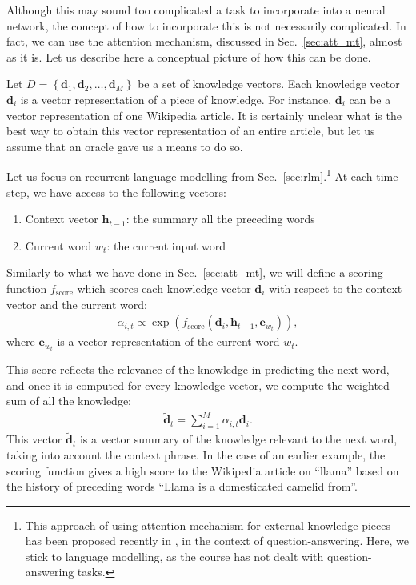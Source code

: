 \documentclass{report}
\newcommand{\vect}[1]{\mathbf{#1}}
\newcommand{\ve}[0]{\vect{e}}
\newcommand{\vh}[0]{\vect{h}}
\newcommand{\vd}[0]{\vect{d}}
\begin{document}
Although this may sound too complicated a task to incorporate into a neural
network, the concept of how to incorporate this is not necessarily complicated.
In fact, we can use the attention mechanism, discussed in Sec.~\ref{sec:att_mt},
almost as it is. Let us describe here a conceptual picture of how this can be
done.

Let $D=\left\{ \vd_1, \vd_2, \ldots, \vd_M \right\}$ be a set of knowledge
vectors. Each knowledge vector $\vd_i$ is a vector representation of a piece of
knowledge. For instance, $\vd_i$ can be a vector representation of one Wikipedia
article. It is certainly unclear what is the best way to obtain this vector
representation of an entire article, but let us assume that an oracle gave us a
means to do so.

Let us focus on recurrent language modelling from Sec.~\ref{sec:rlm}.\footnote{ 
    This approach of using attention mechanism for external knowledge pieces has
    been proposed recently in \cite{bordes2015large}, in the context of
    question-answering. Here, we stick to language modelling, as the course has
    not dealt with question-answering tasks.
}
At each time step, we have access to the following vectors:
\begin{enumerate}
    \itemsep 0em
    \item Context vector $\vh_{t-1}$: the summary all the preceding words
    \item Current word $w_t$: the current input word
\end{enumerate}
Similarly to what we have done in Sec.~\ref{sec:att_mt}, we will define a
scoring function $f_{\text{score}}$ which scores each knowledge vector $\vd_i$ with respect to
the context vector and the current word: 
\begin{align*}
    \alpha_{i,t} \propto \exp\left( f_{\text{score}}(\vd_i, \vh_{t-1}, \ve_{w_t}) \right),
\end{align*}
where $\ve_{w_t}$ is a vector representation of the current word $w_t$.  

This score reflects the relevance of the knowledge in predicting the next word,
and once it is computed for every knowledge vector, we compute the weighted sum
of all the knowledge:
\begin{align*}
    \tilde{\vd}_t = \sum_{i=1}^M \alpha_{i,t} \vd_i.
\end{align*}
This vector $\tilde{\vd}_t$ is a vector summary of the knowledge relevant to the
next word, taking into account the context phrase. In the case of an earlier
example, the scoring function gives a high score to the Wikipedia article on
``llama'' based on the history of preceding words ``Llama is a domesticated
camelid from''. 
\end{document}
